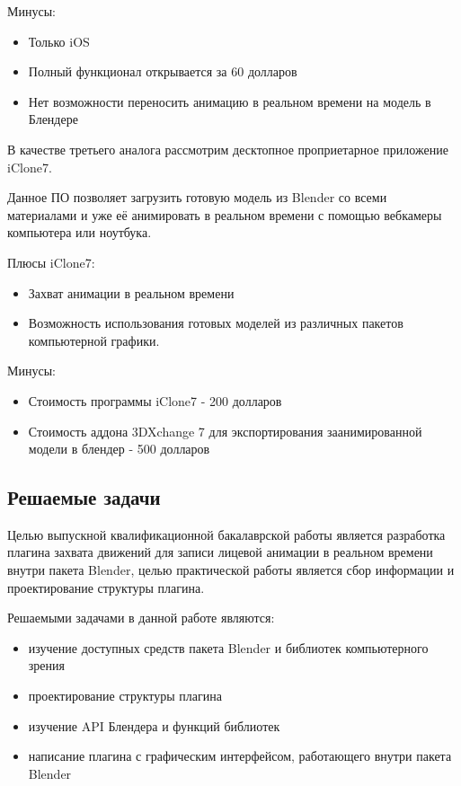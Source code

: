 Минусы:
\begin{itemize}
	\item Только iOS
	\item Полный функционал открывается за 60 долларов
	\item Нет возможности переносить анимацию в реальном времени на модель в Блендере
\end{itemize}

В качестве третьего аналога рассмотрим десктопное проприетарное приложение iClone7.

Данное ПО позволяет загрузить готовую модель из Blender со всеми материалами и уже её анимировать в реальном времени с помощью вебкамеры компьютера или ноутбука.

Плюсы iClone7:
\begin{itemize}
	\item Захват анимации в реальном времени
	\item Возможность использования готовых моделей из различных пакетов компьютерной графики.
\end{itemize}
Минусы:
\begin{itemize}
	\item Стоимость программы iClone7 - 200 долларов
	\item Стоимость аддона 3DXchange 7 для экспортирования заанимированной модели в блендер - 500 долларов
\end{itemize}


\subsection{Решаемые задачи}

Целью выпускной квалификационной бакалаврской работы является разработка плагина захвата движений для записи лицевой анимации в реальном времени внутри пакета Blender, целью практической работы является сбор информации и проектирование структуры плагина.

Решаемыми задачами в данной работе являются:
\begin{itemize}
	\item изучение доступных средств пакета Blender и библиотек компьютерного зрения
	\item проектирование структуры плагина
	\item изучение API Блендера и функций библиотек 
	\item написание плагина с графическим интерфейсом, работающего внутри пакета Blender
\end{itemize}


\clearpage

